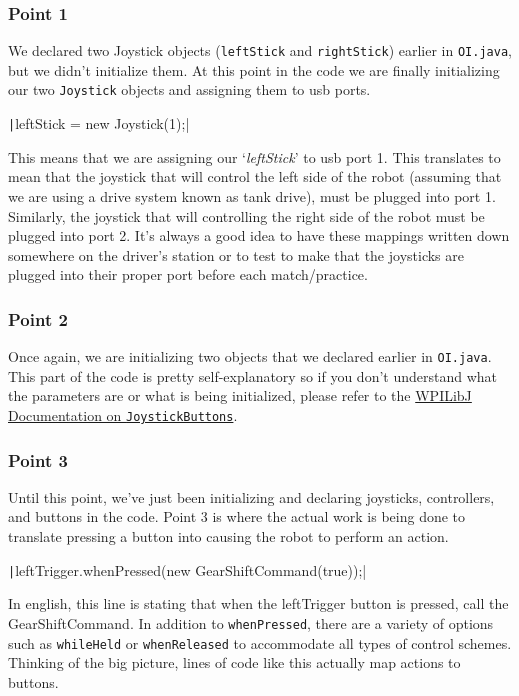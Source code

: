 \documentclass[11pt,fleqn]{article}
\newcommand{\mil}[2][java]{\texttt|#2|}
\begin{document}
\subsubsection{Point 1}
We declared two Joystick objects (\texttt{leftStick} and \texttt{rightStick}) earlier in \texttt{OI.java},
but we didn't initialize them. At this point in the code we are finally initializing our two \texttt{Joystick}
objects and assigning them to usb ports. 

\mil{leftStick = new Joystick(1);}

This means that we are assigning our `\textit{leftStick}' to usb port 1. This translates to mean that
the joystick that will control the left side of the robot (assuming that we are using a drive system known
as tank drive), must be plugged into port 1. Similarly, the joystick that will controlling the right side
of the robot must be plugged into port 2. It's always a good idea to have these mappings written down
somewhere on the driver's station or to test to make that the joysticks are plugged into their proper
port before each match/practice. 

\subsubsection{Point 2}
Once again, we are initializing two objects that we declared earlier in \texttt{OI.java}. This part of
the code is pretty self-explanatory so if you don't understand what the parameters are or what is being
initialized, please refer to the \href{http://first.wpi.edu/FRC/roborio/release/docs/java/}{WPILibJ Documentation
on \texttt{JoystickButtons}}.

\subsubsection{Point 3}
Until this point, we've just been initializing and declaring joysticks, controllers, and buttons in the
code. Point 3 is where the actual work is being done to translate pressing a button into causing the robot
to perform an action. 

\mil{leftTrigger.whenPressed(new GearShiftCommand(true));}

In english, this line is stating that when the leftTrigger button is pressed, call the GearShiftCommand.
In addition to \texttt{whenPressed}, there are a variety of options such as \texttt{whileHeld} or \texttt
{whenReleased} to accommodate all types of control schemes. Thinking of the big picture, lines of code
like this actually map actions to buttons. 
\end{document}
